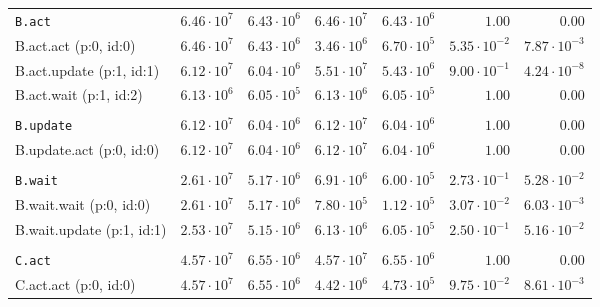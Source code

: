 \begin{table}[htbp]
{\begin{tabular}{lrrrrrr}
\\[-8pt]\texttt{B.act}                & $6.46 \cdot 10^{7}$ & $6.43 \cdot 10^{6}$ & $6.46 \cdot 10^{7}$ & $6.43 \cdot 10^{6}$ &               $1.00$ &               $0.00$ \\
\hspace{3mm}B.act.act (p:0, id:0)     & $6.46 \cdot 10^{7}$ & $6.43 \cdot 10^{6}$ & $3.46 \cdot 10^{6}$ & $6.70 \cdot 10^{5}$ & $5.35 \cdot 10^{-2}$ & $7.87 \cdot 10^{-3}$ \\
\hspace{3mm}B.act.update (p:1, id:1)  & $6.12 \cdot 10^{7}$ & $6.04 \cdot 10^{6}$ & $5.51 \cdot 10^{7}$ & $5.43 \cdot 10^{6}$ & $9.00 \cdot 10^{-1}$ & $4.24 \cdot 10^{-8}$ \\
\hspace{3mm}B.act.wait (p:1, id:2)    & $6.13 \cdot 10^{6}$ & $6.05 \cdot 10^{5}$ & $6.13 \cdot 10^{6}$ & $6.05 \cdot 10^{5}$ &               $1.00$ &               $0.00$ \\
\\[-8pt]\texttt{B.update}             & $6.12 \cdot 10^{7}$ & $6.04 \cdot 10^{6}$ & $6.12 \cdot 10^{7}$ & $6.04 \cdot 10^{6}$ &               $1.00$ &               $0.00$ \\
\hspace{3mm}B.update.act (p:0, id:0)  & $6.12 \cdot 10^{7}$ & $6.04 \cdot 10^{6}$ & $6.12 \cdot 10^{7}$ & $6.04 \cdot 10^{6}$ &               $1.00$ &               $0.00$ \\
\\[-8pt]\texttt{B.wait}               & $2.61 \cdot 10^{7}$ & $5.17 \cdot 10^{6}$ & $6.91 \cdot 10^{6}$ & $6.00 \cdot 10^{5}$ & $2.73 \cdot 10^{-1}$ & $5.28 \cdot 10^{-2}$ \\
\hspace{3mm}B.wait.wait (p:0, id:0)   & $2.61 \cdot 10^{7}$ & $5.17 \cdot 10^{6}$ & $7.80 \cdot 10^{5}$ & $1.12 \cdot 10^{5}$ & $3.07 \cdot 10^{-2}$ & $6.03 \cdot 10^{-3}$ \\
\hspace{3mm}B.wait.update (p:1, id:1) & $2.53 \cdot 10^{7}$ & $5.15 \cdot 10^{6}$ & $6.13 \cdot 10^{6}$ & $6.05 \cdot 10^{5}$ & $2.50 \cdot 10^{-1}$ & $5.16 \cdot 10^{-2}$ \\
\\[-8pt]\texttt{C.act}                & $4.57 \cdot 10^{7}$ & $6.55 \cdot 10^{6}$ & $4.57 \cdot 10^{7}$ & $6.55 \cdot 10^{6}$ &               $1.00$ &               $0.00$ \\
\hspace{3mm}C.act.act (p:0, id:0)     & $4.57 \cdot 10^{7}$ & $6.55 \cdot 10^{6}$ & $4.42 \cdot 10^{6}$ & $4.73 \cdot 10^{5}$ & $9.75 \cdot 10^{-2}$ & $8.61 \cdot 10^{-3}$ \\

\end{tabular}}
\end{table}
